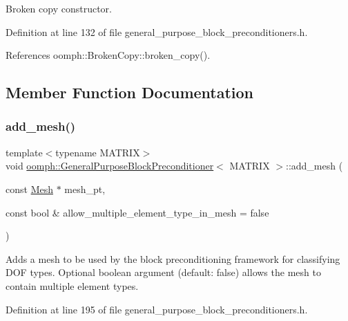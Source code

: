 Broken copy constructor. 



Definition at line 132 of file general\+\_\+purpose\+\_\+block\+\_\+preconditioners.\+h.



References oomph\+::\+Broken\+Copy\+::broken\+\_\+copy().



\subsection{Member Function Documentation}
\mbox{\label{classoomph_1_1GeneralPurposeBlockPreconditioner_a8a92f8e0db68105f2fb548e5f7cd0732}} 
\subsubsection{\texorpdfstring{add\+\_\+mesh()}{add\_mesh()}}
{\footnotesize\ttfamily template$<$typename M\+A\+T\+R\+IX$>$ \\
void \hyperlink{classoomph_1_1GeneralPurposeBlockPreconditioner}{oomph\+::\+General\+Purpose\+Block\+Preconditioner}$<$ M\+A\+T\+R\+IX $>$\+::add\+\_\+mesh (\begin{DoxyParamCaption}\item[{const \hyperlink{classoomph_1_1Mesh}{Mesh} $\ast$}]{mesh\+\_\+pt,  }\item[{const bool \&}]{allow\+\_\+multiple\+\_\+element\+\_\+type\+\_\+in\+\_\+mesh = {\ttfamily false} }\end{DoxyParamCaption})\hspace{0.3cm}{\ttfamily [inline]}}



Adds a mesh to be used by the block preconditioning framework for classifying D\+OF types. Optional boolean argument (default\+: false) allows the mesh to contain multiple element types. 



Definition at line 195 of file general\+\_\+purpose\+\_\+block\+\_\+preconditioners.\+h.

\mbox{\label{classoomph_1_1GeneralPurposeBlockPreconditioner_a3272742d3c7f86327d33c5647af874e6}} 

